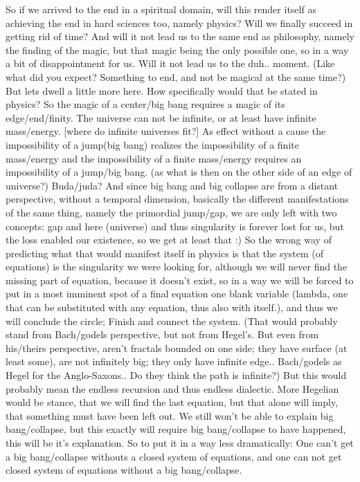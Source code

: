 \documentclass{book}
\begin{document}
So if we arrived to the end in a spiritual domain, will this render itself as achieving the end in hard sciences too, namely physics? Will we finally succeed in getting rid of time? And will it not lead us to the same end as philosophy, namely the finding of the magic, but that magic being the only possible one, so in a way a bit of disappointment for us. Will it not lead us to the duh.. moment. (Like what did you expect? Something to end, and not be magical at the same time?) But lets dwell a little more here. How specifically would that be stated in physics?
So the magic of a center/big bang requires a magic of its edge/end/finity. The universe can not be infinite, or at least have infinite mass/energy. [where do infinite universes fit?] As effect without a cause the impossibility of a jump(big bang) realizes the impossibility of a finite mass/energy and the impossibility of a finite mass/energy requires an impossibility of a jump/big bang. (as what is then on the other side of an edge of universe?)
Buda/juda?
And since big bang and big collapse are from a distant perspective, without a temporal dimension, basically the different manifestations of the same thing, namely the primordial jump/gap, we are only left with two concepts: gap and here (universe) and thus singularity is forever lost for us, but the loss enabled our existence, so we get at least that :)
So the wrong way of predicting what that would manifest itself in physics is that the system (of equations) is the singularity we were looking for, although we will never find the missing part of equation, because it doesn't exist, so in a way we will be forced to put in a most imminent spot of a final equation one blank variable (lambda, one that can be substituted with any equation, thus also with itself.), and thus we will conclude the circle; Finish and connect the system.
(That would probably stand from Bach/godels perspective, but not from Hegel's. But even from his/theirs perspective, aren't fractals bounded on one side; they have surface (at least some), are not infinitely big; they only have infinite edge.. Bach/godels as Hegel for the Anglo-Saxons.. Do they think the path is infinite?) But this would probably mean the endless recursion and thus endless dialectic. More Hegelian would be stance, that we will find the last equation, but that alone will imply, that something must have been left out. We still won't be able to explain big bang/collapse, but this exactly will require big bang/collapse to have happened, this will be it's explanation.
So to put it in a way less dramatically: One can't get a big bang/collapse withouts a closed system of equations, and one can not get closed system of equations without a big bang/collapse. 
\end{document}
